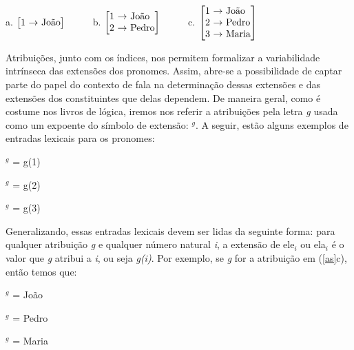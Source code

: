 \begin{exe}
	
	\ex a. $\left[%
	\begin{array}{@{}c@{\ }l@{\ }l@{}}%
	1 & \rightarrow& \text{João} \\
	\end{array}\right]$
	\ \ \ \ \ b. $\left[%
	\begin{array}{@{}c@{\ }l@{\ }l@{}}%
	1 & \rightarrow& \text{João} \\
	2 & \rightarrow & \text{Pedro} \\
	\end{array}\right]$
	\ \ \ \ \ c. $\left[%
	\begin{array}{@{}c@{\ }l@{\ }l@{}}%
	1 & \rightarrow& \text{João} \\
	2 & \rightarrow & \text{Pedro} \\
	3 & \rightarrow & \text{Maria} \\
	\end{array}\right]$
	
	\label{as}
\end{exe}


Atribuições, junto com os índices, nos permitem
formalizar a variabilidade intrínseca das extensões dos pronomes. Assim, abre-se a possibilidade de captar parte do papel do contexto de fala na determinação dessas extensões e das extensões dos constituintes que delas dependem. De maneira geral, como é costume nos livros de lógica,
iremos nos referir a atribuições pela letra \textit{g} usada
como um expoente do símbolo de extensão: \den{$\alpha$}$^{g}$.
A seguir, estão alguns exemplos de entradas lexicais para os
pronomes:

\begin{exe}
\ex {}$^{g}$ = g(1)\label{g1}

\ex {}$^{g}$ = g(2)

\ex {}$^{g}$ = g(3)

\end{exe}

\n Generalizando, essas entradas lexicais devem ser lidas da
seguinte forma: para qualquer atribuição \textit{g} e qualquer
número natural \textit{i}, a extensão de ele$_{i}$ ou ela$_{i}$ é o
valor que \textit{g} atribui a \textit{i}, ou seja \textit{g(i)}. Por exemplo, se \textit{g} for a atribuição em (\ref{as}c), então temos que:

\begin{exe}

\ex {}$^{g}$ = João

\ex {}$^{g}$ = Pedro

\ex {}$^{g}$ = Maria

\end{exe}

